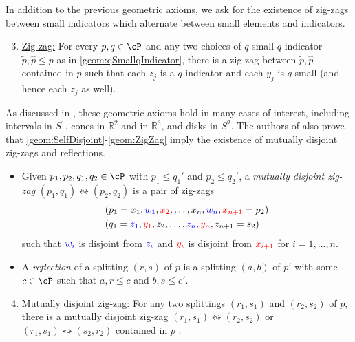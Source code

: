 \documentclass[11pt,reqno]{amsart}
\numberwithin{equation}{section}
\theoremstyle{plain}
\theoremstyle{definition}
\begin{document}
\noindent In addition to the previous geometric axioms, we ask for the existence of zig-zags between small indicators which alternate between small elements and indicators.

\begin{enumerate}[label=\textup{(GA\arabic*)}, series=geom]
\setcounter{enumi}{2}
\item
\label{geom:ZigZag}
\underline{Zig-zag:}
For every $p,q\in\cP$ and any two choices of $q$-small $q$-indicator $\widetilde{p},\widehat{p}\leq p$ as in \ref{geom:qSmallqIndicator},
there is a zig-zag between $\widetilde{p},\widehat{p}$ contained in $p$ such that each $z_j$ is a $q$-indicator and each $y_j$ is $q$-small (and hence each $z_j$ as well).
\end{enumerate}

\noindent As discussed in \cite{MR4927814}, these geometric axioms hold in many cases of interest, including intervals in $S^1$, cones in $\mathbb R^2$ and in $\mathbb R^3$, and disks in $S^2$. 
The authors of \cite{MR4927814} also prove that \ref{geom:SelfDisjoint}-\ref{geom:ZigZag} imply the existence of mutually disjoint zig-zags and reflections.

\begin{itemize}
\item 
    Given $p_1,p_2,q_1,q_2\in \cP$ with $p_1\leq q_1'$ and $p_2\leq q_2'$, a \emph{mutually disjoint zig-zag} $(p_1,q_1) \leftrightsquigarrow (p_2,q_2)$ is a pair of zig-zags
    \begin{align*}
        &(p_1=x_1,\textcolor{blue}{w_1}, \textcolor{red}{x_2}, \dots, x_n, \textcolor{blue}{w_n}, \textcolor{red}{x_{n+1}}=p_2)\\
        &(q_1=\textcolor{blue}{z_1}, \textcolor{red}{y_1}, z_2, \dots, \textcolor{blue}{z_n}, \textcolor{red}{y_n}, z_{n+1}=s_2)
    \end{align*}
    such that $\textcolor{blue}{w_i}$ is disjoint from $\textcolor{blue}{z_i}$ and $\textcolor{red}{y_i}$ is disjoint from $\textcolor{red}{x_{i+1}}$ for $i=1,\dots, n$.
\item 
A \emph{reflection} of a splitting $(r,s)$ of $p$ is a splitting $(a,b)$ of $p'$ with some $c \in \cP$ such that $a,r \leq c$ and $b,s \leq c'$.
\end{itemize}

\begin{enumerate}[label=\textup{(GA\arabic*)}, series=geom]
\setcounter{enumi}{3}
\item
\label{geom:disjointZigZag}
\underline{Mutually disjoint zig-zag:}
    For any two splittings $(r_1,s_1)$ and $(r_2,s_2)$ of $p$, there is a mutually disjoint zig-zag $(r_1,s_1) \leftrightsquigarrow(r_2,s_2)$ or $(r_1,s_1) \leftrightsquigarrow(s_2,r_2)$ contained in $p$ \cite[Theorem~4.19]{MR4927814}.
    \end{enumerate}
\end{document}
